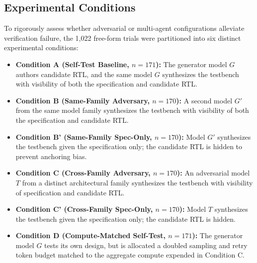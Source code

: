 \documentclass[conference]{IEEEtran}
\begin{document}
\subsection{Experimental Conditions}
To rigorously assess whether adversarial or multi-agent configurations alleviate verification failure, the 1,022 free-form trials were partitioned into six distinct experimental conditions:
\begin{itemize}
    \item \textbf{Condition A (Self-Test Baseline, $n=171$):} The generator model $G$ authors candidate RTL, and the same model $G$ synthesizes the testbench with visibility of both the specification and candidate RTL.
    \item \textbf{Condition B (Same-Family Adversary, $n=170$):} A second model $G'$ from the same model family synthesizes the testbench with visibility of both the specification and candidate RTL.
    \item \textbf{Condition B' (Same-Family Spec-Only, $n=170$):} Model $G'$ synthesizes the testbench given the specification only; the candidate RTL is hidden to prevent anchoring bias.
    \item \textbf{Condition C (Cross-Family Adversary, $n=170$):} An adversarial model $T$ from a distinct architectural family synthesizes the testbench with visibility of specification and candidate RTL.
    \item \textbf{Condition C' (Cross-Family Spec-Only, $n=170$):} Model $T$ synthesizes the testbench given the specification only; the candidate RTL is hidden.
    \item \textbf{Condition D (Compute-Matched Self-Test, $n=171$):} The generator model $G$ tests its own design, but is allocated a doubled sampling and retry token budget matched to the aggregate compute expended in Condition C.
\end{itemize}
\end{document}

